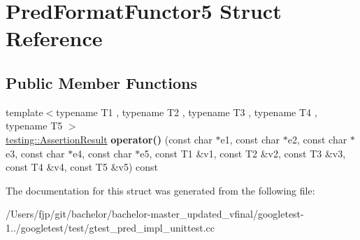 \hypertarget{struct_pred_format_functor5}{}\section{Pred\+Format\+Functor5 Struct Reference}
\label{struct_pred_format_functor5}
\subsection*{Public Member Functions}
\begin{DoxyCompactItemize}
\item 
\mbox{\label{struct_pred_format_functor5_a0fe9e8e9ae614ea577cf1b34e9cfde58}} 
{\footnotesize template$<$typename T1 , typename T2 , typename T3 , typename T4 , typename T5 $>$ }\\\mbox{\hyperlink{classtesting_1_1_assertion_result}{testing\+::\+Assertion\+Result}} {\bfseries operator()} (const char $\ast$e1, const char $\ast$e2, const char $\ast$e3, const char $\ast$e4, const char $\ast$e5, const T1 \&v1, const T2 \&v2, const T3 \&v3, const T4 \&v4, const T5 \&v5) const
\end{DoxyCompactItemize}


The documentation for this struct was generated from the following file\+:\begin{DoxyCompactItemize}
\item 
/\+Users/fjp/git/bachelor/bachelor-\/master\+\_\+updated\+\_\+vfinal/googletest-\/1../googletest/test/gtest\+\_\+pred\+\_\+impl\+\_\+unittest.\+cc\end{DoxyCompactItemize}
